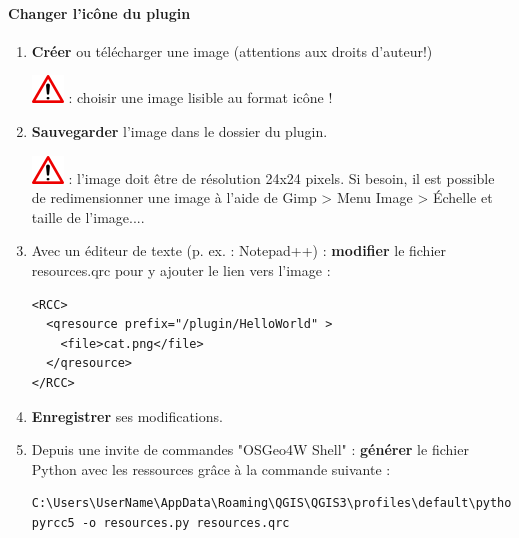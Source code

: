 \documentclass[11pt]{article}
\begin{document}
\paragraph*{Changer l'icône du plugin}
\begin{enumerate}\itemsep0.4em

\item \textbf{Créer} ou télécharger une image (attentions aux droits d'auteur!)

\includegraphics[scale=1]{warningt.png} \underline{}: choisir une image lisible au format icône !

\item \textbf{Sauvegarder} l'image dans le dossier du plugin.

\includegraphics[scale=1]{warningt.png} \underline{}: l'image doit être de résolution 24x24 pixels. Si besoin, il est possible de redimensionner une image à l'aide de Gimp > Menu \og{}Image > Échelle et taille de l'image...\fg{}. 

\item Avec un éditeur de texte (p. ex. : Notepad++) : \textbf{modifier} le fichier \og{}resources.qrc\fg{} pour y ajouter le lien vers l'image : 
\vspace*{-1em}
\begin{center}
\begin{minipage}[t]{0.50\textwidth}
\begin{verbatim}
<RCC>
  <qresource prefix="/plugin/HelloWorld" >
    <file>cat.png</file>
  </qresource>
</RCC>
\end{verbatim}
\end{minipage}
\end{center}

\vspace*{0.4em}
\item \textbf{Enregistrer} ses modifications.

\item Depuis une invite de commandes "OSGeo4W Shell" : \textbf{générer} le fichier Python avec les ressources grâce à la commande suivante : 
\vspace*{-1em}
\begin{center}
\begin{minipage}[t]{0.92\textwidth}
\begin{verbatim}
C:\Users\UserName\AppData\Roaming\QGIS\QGIS3\profiles\default\python\plugins\helloworld>
pyrcc5 -o resources.py resources.qrc
\end{verbatim}
\end{minipage}
\end{center}


\end{enumerate}
\end{document}
